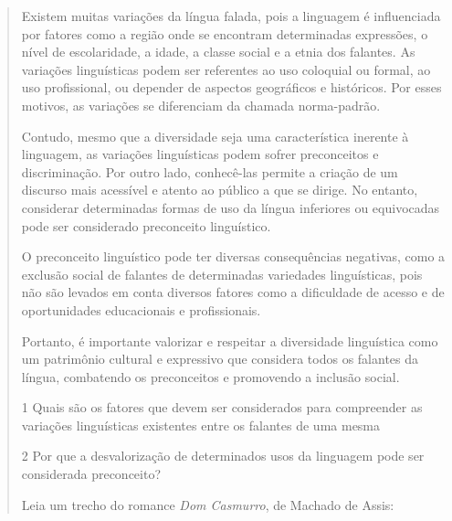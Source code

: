 \begin{quote}
{\begin{itemize}
\begin{itemize}
{Existem muitas variações da língua falada, pois a linguagem é
influenciada por fatores como a região onde se encontram determinadas
expressões, o nível de escolaridade, a idade, a classe social e a etnia
dos falantes. As variações linguísticas podem ser referentes
ao uso coloquial ou formal, ao uso profissional, ou depender de aspectos
geográficos e históricos. Por esses motivos, as variações
se diferenciam da chamada norma-padrão.

Contudo, mesmo que a diversidade seja uma característica
inerente à linguagem, as variações linguísticas podem sofrer preconceitos
e discriminação. Por outro lado, conhecê-las permite a criação de um
discurso mais acessível e atento ao público a que se dirige. No entanto,
considerar determinadas formas de uso da língua inferiores ou
equivocadas pode ser considerado preconceito linguístico.

O preconceito linguístico pode ter diversas consequências negativas,
como a exclusão social de falantes de determinadas variedades
linguísticas, pois não são levados em conta diversos fatores como a
dificuldade de acesso e de oportunidades educacionais e profissionais.

Portanto, é importante valorizar e respeitar a diversidade linguística
como um patrimônio cultural e expressivo que considera todos os falantes
da língua, combatendo os preconceitos e promovendo a inclusão social.}



\num{1} Quais são os fatores que devem ser considerados para compreender as
variações linguísticas existentes entre os falantes de uma mesma


\num{2} Por que a desvalorização de determinados usos da linguagem pode ser
considerada preconceito?


Leia um trecho do romance \textit{Dom Casmurro}, de Machado de Assis:


\end{itemize}
\end{itemize}}
\end{quote}

